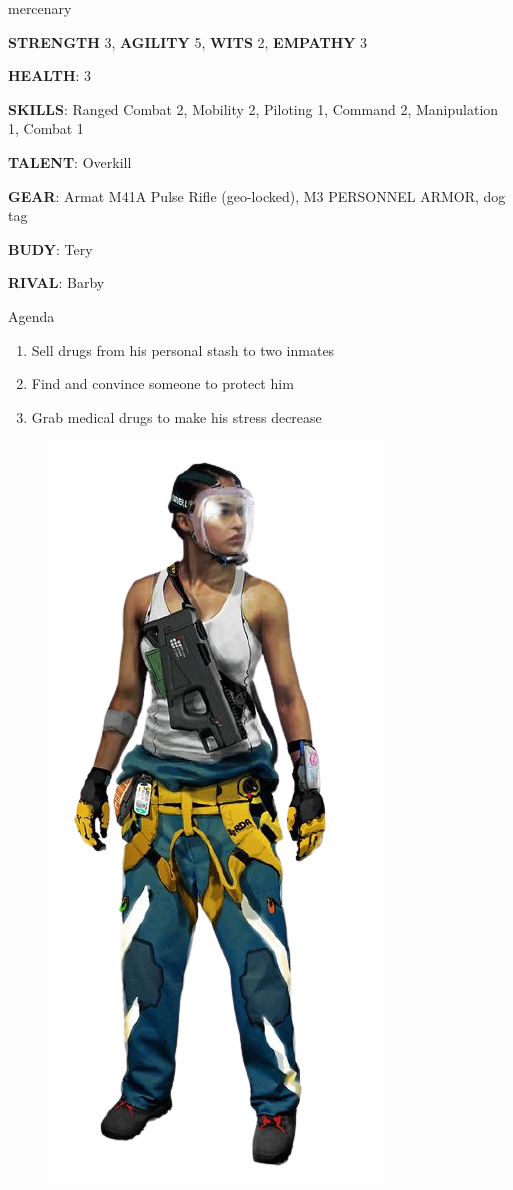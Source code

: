 \begin{rpg-commentbox}{}
    mercenary

    \textbf{STRENGTH} 3, \textbf{AGILITY} 5, \textbf{WITS} 2, \textbf{EMPATHY} 3

    \textbf{HEALTH}: 3

    \textbf{SKILLS}: Ranged Combat 2, Mobility 2, Piloting 1, Command 2, Manipulation 1, Combat 1
    
    \textbf{TALENT}: Overkill
    
    \textbf{GEAR}: Armat M41A Pulse Rifle (geo-locked), M3 PERSONNEL ARMOR, dog tag

    \textbf{BUDY}: Tery
    
    \textbf{RIVAL}: Barby
\end{rpg-commentbox}


\begin{rpg-commentbox}{Agenda}
    \begin{enumerate}[label=\textbf{Act \arabic*}, leftmargin=1cm]
        \item Sell drugs from his personal stash to two inmates
        \item Find and convince someone to protect him
        \item Grab medical drugs to make his stress decrease
    \end{enumerate}
\end{rpg-commentbox}


\begin{figure}
    \centering
    \includegraphics[width=.35\textwidth]{img/bg/firefighter-4.png}
    \label{fig:refinery}
\end{figure}




\clearpage

